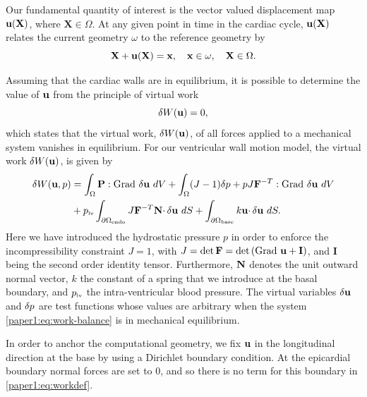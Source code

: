 Our fundamental quantity of interest is the vector valued displacement
map $\mathbf{u}(\mathbf{X})$, where $\mathbf{X} \in \Omega$.  At any given
point in time in the cardiac cycle, $\mathbf{u}(\mathbf{X})$ relates
the current geometry $\omega$ to the reference geometry by
 \begin{equation}
{\bf X} + {\bf u}({\bf X}) = {\bf x}, \quad {\bf x} \in \omega, \quad {\bf X} \in \Omega. 
\end{equation}

Assuming that the cardiac walls are in equilibrium,
it is possible to determine the value of $\mathbf{u}$ from the principle of
virtual work
\begin{equation}
  \label{paper1:eq:work-balance}
  \delta W(\mathbf{u}) = 0,
\end{equation}
which states that the virtual work, $\delta W(\mathbf{u})$, of all forces
applied to a mechanical system vanishes in equilibrium. For our ventricular wall motion
model, the virtual work $\delta W(\mathbf{u})$, is given by
\begin{equation}
\begin{aligned}
\label{paper1:eq:workdef}
 \delta W(\uvec, p) &= \int_{\Omega} \FPK : \Grad \ \du \ dV 
		  + \int_{\Omega} (J - 1) \dpre + p J \F^{-T} : \Grad \ \du \ dV  \\
		 &+ \plv \int_{\lvendo} J \F^{-T} \Nvec \cdotp \du \ dS 
		  +  \int_{\lvbase}  k \uvec \cdotp \du \ dS.
 \end{aligned}
\end{equation}
Here we have introduced the hydrostatic pressure $p$ in order to enforce the 
incompressibility constraint $J =1$, with $J = \det \mathbf{F} = \det  \left(\mathrm{Grad} \ \mathbf{u} + \mathbf{I}\right)$, 
and $\mathbf{I}$ being the second order identity tensor. 
Furthermore, $\mathbf{N}$ denotes the unit outward normal vector, $k$ 
the constant of a spring that we introduce at the basal boundary, and $p_{\textnormal{\tiny{lv}}}$ the intra-ventricular 
blood pressure. The virtual variables $\delta {\bf u}$ and $\delta {p}$ are test functions whose values
are arbitrary when the system \eqref{paper1:eq:work-balance} is in mechanical
equilibrium.

In order to anchor the computational geometry, we fix $\mathbf{u}$ in the longitudinal direction 
at the base by using a Dirichlet boundary condition. At the epicardial boundary normal
forces are set to 0, and so there is no term for this boundary in
\eqref{paper1:eq:workdef}.

